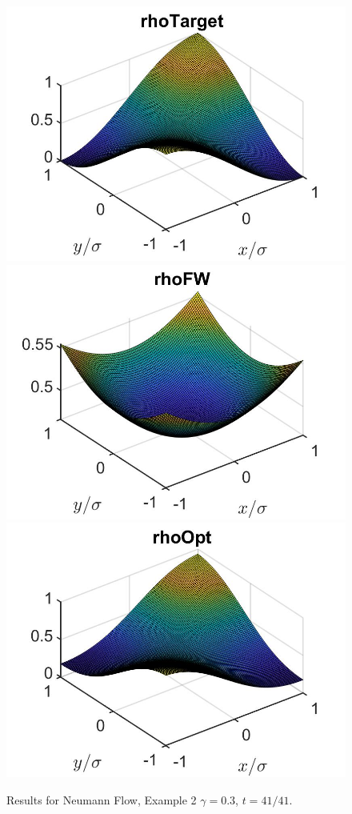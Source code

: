 \documentclass[11pt, a4paper]{article}
\theoremstyle{definition}
\begin{document}
\begin{figure}[h]
	\includegraphics[scale=0.3]{rhoHat2DN3b.jpg}
	\includegraphics[scale=0.3]{rhoFW2DN3b.jpg}
	\includegraphics[scale=0.3]{rhoOpt2D3b.jpg}
	\caption{Results for Neumann Flow, Example 2 $\gamma = 0.3$, $t = 41/41$.}
	\label{Ex12DN3b}
\end{figure}
\end{document}
